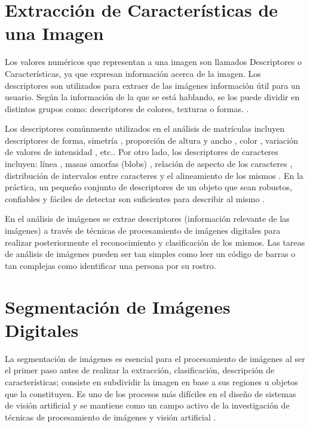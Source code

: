 \section{Extracción de Características de una Imagen}

Los valores numéricos que representan a una imagen son llamados Descriptores o Características, ya que expresan información acerca de la imagen. Los descriptores son utilizados para extraer de las imágenes información útil para un usuario. Según la información de la que se está hablando, se los puede dividir en distintos grupos como: descriptores de colores, texturas o formas. \cite{Deselaers2008-zg}.

Los descriptores comúnmente utilizados en el análisis de matrículas incluyen descriptores de forma, simetría \cite{Kim2001-yv}, proporción de altura y ancho \cite{Naito2000-im}, color \cite{Kim1996-js}, variación de valores de intensidad \cite{Draghici1997-gz}, etc.. Por otro lado, los descriptores de caracteres incluyen: línea \cite{Yu2000-tm}, masas amorfas (blobs) \cite{Hontani2001-lk}, relación de aspecto de los caracteres \cite{Hermida1997-ds}, distribución de intervalos entre caracteres \cite{Poon1995-pw} y el alineamiento de los mismos \cite{Soh1994-mc}. En la práctica, un pequeño conjunto de descriptores de un objeto que sean robustos, confiables y fáciles de detectar son suficientes para describir al mismo \cite{Chang2004-kg}. 

En el análisis de imágenes se extrae descriptores (información relevante de las imágenes) a través de técnicas de procesamiento de imágenes digitales para realizar posteriormente el reconocimiento y clasificación de los mismos. Las tareas de análisis de imágenes pueden ser tan simples como leer un código de barras o tan complejas como identificar una persona por su rostro. \cite{Solomon2011-xz}


\section{Segmentación de Imágenes Digitales}

La segmentación de imágenes es esencial para el procesamiento de imágenes al ser el primer paso antes de realizar la extracción, clasificación, descripción de características; consiste en subdividir la imagen en base a sus regiones u objetos que la constituyen. Es uno de los procesos más difíciles en el diseño de sistemas de visión artificial y se mantiene como un campo activo de la investigación de técnicas de procesamiento de imágenes y visión artificial \cite{Solomon2011-xz}.

